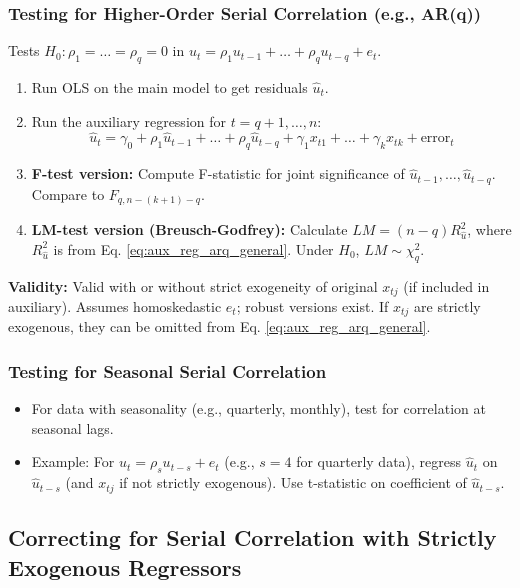 \documentclass[a4paper, 10pt]{article}
\theoremstyle{definition}	%
\begin{document}
\subsubsection{Testing for Higher-Order Serial Correlation (e.g., AR(q))}
Tests \(H_0: \rho_1 = \dots = \rho_q = 0\) in \(u_t = \rho_1 u_{t-1} + \dots + \rho_q u_{t-q} + e_t\).
\begin{enumerate}
    \item Run OLS on the main model to get residuals \(\hat{u}_t\).
    \item Run the auxiliary regression for \(t=q+1, \dots, n\):
    \begin{equation} \label{eq:aux_reg_arq_general}
    \hat{u}_t = \gamma_0 + \rho_1 \hat{u}_{t-1} + \dots + \rho_q \hat{u}_{t-q} + \gamma_1 x_{t1} + \dots + \gamma_k x_{tk} + \text{error}_t
    \end{equation}
    \item \textbf{F-test version:} Compute F-statistic for joint significance of \(\hat{u}_{t-1}, \dots, \hat{u}_{t-q}\). Compare to \(F_{q, n-(k+1)-q}\).
    \item \textbf{LM-test version (Breusch-Godfrey):} Calculate \(LM = (n-q) R_{\hat{u}}^2\), where \(R_{\hat{u}}^2\) is from Eq. \eqref{eq:aux_reg_arq_general}. Under \(H_0\), \(LM \sim \chi_q^2\).
\end{enumerate}
\textbf{Validity:} Valid with or without strict exogeneity of original \(x_{tj}\) (if included in auxiliary). Assumes homoskedastic \(e_t\); robust versions exist. If \(x_{tj}\) are strictly exogenous, they can be omitted from Eq. \eqref{eq:aux_reg_arq_general}.

\subsubsection{Testing for Seasonal Serial Correlation}
\begin{itemize}
    \item For data with seasonality (e.g., quarterly, monthly), test for correlation at seasonal lags.
    \item Example: For \(u_t = \rho_s u_{t-s} + e_t\) (e.g., \(s=4\) for quarterly data), regress \(\hat{u}_t\) on \(\hat{u}_{t-s}\) (and \(x_{tj}\) if not strictly exogenous). Use t-statistic on coefficient of \(\hat{u}_{t-s}\).
\end{itemize}

\subsection{Correcting for Serial Correlation with Strictly Exogenous Regressors}
\end{document}
